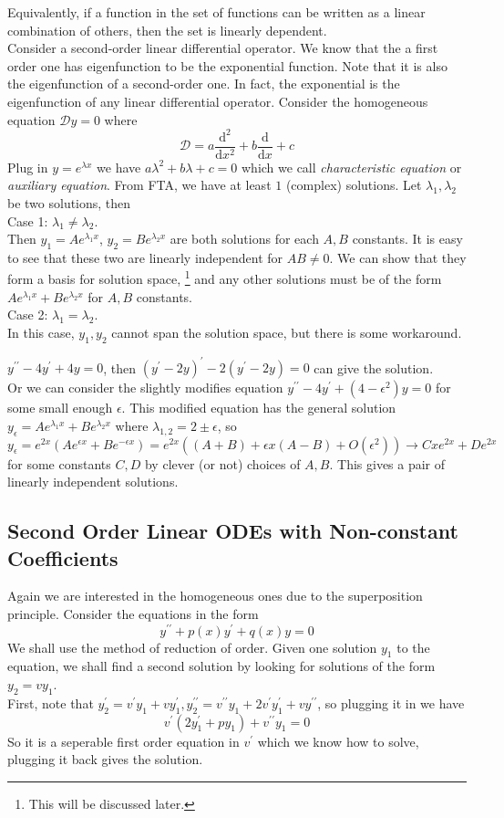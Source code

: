 Equivalently, if a function in the set of functions can be written as a linear combination of others, then the set is linearly dependent.\\
Consider a second-order linear differential operator.
We know that the a first order one has eigenfunction to be the exponential function.
Note that it is also the eigenfunction of a second-order one.
In fact, the exponential is the eigenfunction of any linear differential operator.
Consider the homogeneous equation $\mathscr{D}y=0$ where
$$\mathscr{D}=a\frac{\mathrm d^2}{\mathrm dx^2}+b\frac{\mathrm d}{\mathrm dx}+c$$
Plug in $y=e^{\lambda x}$ we have $a\lambda^2+b\lambda+c=0$ which we call \textit{characteristic equation} or \textit{auxiliary equation}.
From FTA, we have at least $1$ (complex) solutions.
Let $\lambda_1,\lambda_2$ be two solutions, then\\
Case 1: $\lambda_1\neq\lambda_2$.\\
Then $y_1=Ae^{\lambda_1x}$, $y_2=Be^{\lambda_2x}$ are both solutions for each $A,B$ constants.
It is easy to see that these two are linearly independent for $AB\neq 0$.
We can show that they form a basis for solution space,
\footnote{This will be discussed later.}
and any other solutions must be of the form $Ae^{\lambda_1x}+Be^{\lambda_2x}$ for $A,B$ constants.\\
Case 2: $\lambda_1=\lambda_2$.\\
In this case, $y_1,y_2$ cannot span the solution space, but there is some workaround.
\begin{example}
    $y^{\prime\prime}-4y^\prime+4y=0$, then $(y^\prime-2y)^\prime-2(y^\prime-2y)=0$ can give the solution.\\
    Or we can consider the slightly modifies equation $y^{\prime\prime}-4y^\prime+(4-\epsilon^2)y=0$ for some small enough $\epsilon$.
    This modified equation has the general solution $y_\epsilon=Ae^{\lambda_1x}+Be^{\lambda_2x}$ where $\lambda_{1,2}=2\pm\epsilon$, so
    $$y_\epsilon=e^{2x}(Ae^{\epsilon x}+Be^{-\epsilon x})=e^{2x}((A+B)+\epsilon x(A-B)+O(\epsilon^2))\to Cxe^{2x}+De^{2x}$$
    for some constants $C,D$ by clever (or not) choices of $A,B$.
    This gives a pair of linearly independent solutions.
\end{example}
\subsection{Second Order Linear ODEs with Non-constant Coefficients}
Again we are interested in the homogeneous ones due to the superposition principle.
Consider the equations in the form
$$y^{\prime\prime}+p(x)y^\prime+q(x)y=0$$
We shall use the method of reduction of order.
Given one solution $y_1$ to the equation, we shall find a second solution by looking for solutions of the form $y_2=vy_1$.\\
First, note that $y_2^\prime=v^\prime y_1+vy_1^\prime,y_2^{\prime\prime}=v^{\prime\prime}y_1+2v^\prime y_1^\prime +vy^{\prime\prime}$, so plugging it in we have
$$v^\prime(2y_1^\prime+py_1)+v^{\prime\prime}y_1=0$$
So it is a seperable first order equation in $v^\prime$ which we know how to solve, plugging it back gives the solution.
